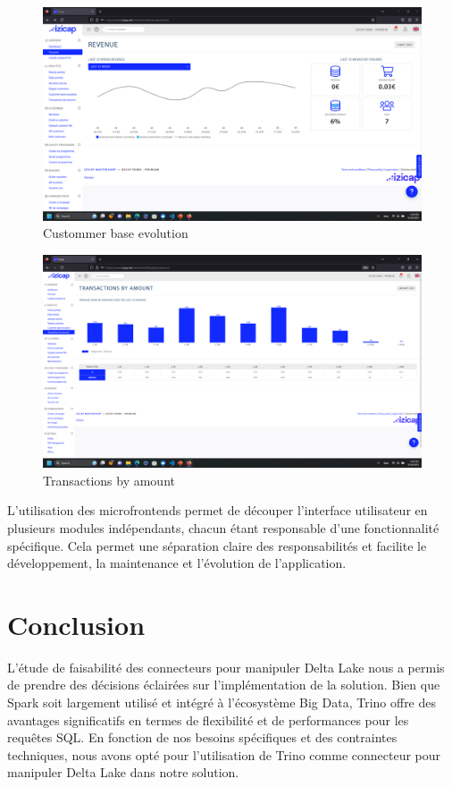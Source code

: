 \begin{figure}[H]
\centering
\includegraphics[width=\linewidth]{images/revenu.png}
\caption{Custommer base evolution}\label{fig:izicap-3}
\end{figure}
    
\begin{figure}[H]
\centering
\includegraphics[width=\linewidth]{images/data-2.png}
\caption{Transactions by amount}\label{fig:izicap-4}
\end{figure}
        
L'utilisation des microfrontends permet de découper l'interface utilisateur en plusieurs modules indépendants, chacun étant responsable d'une fonctionnalité spécifique. Cela permet une séparation claire des responsabilités et facilite le développement, la maintenance et l'évolution de l'application.

\section*{Conclusion}
L'étude de faisabilité des connecteurs pour manipuler Delta Lake nous a permis de prendre des décisions éclairées sur l'implémentation de la solution. Bien que Spark soit largement utilisé et intégré à l'écosystème Big Data, Trino offre des avantages significatifs en termes de flexibilité et de performances pour les requêtes SQL. En fonction de nos besoins spécifiques et des contraintes techniques, nous avons opté pour l'utilisation de Trino comme connecteur pour manipuler Delta Lake dans notre solution.